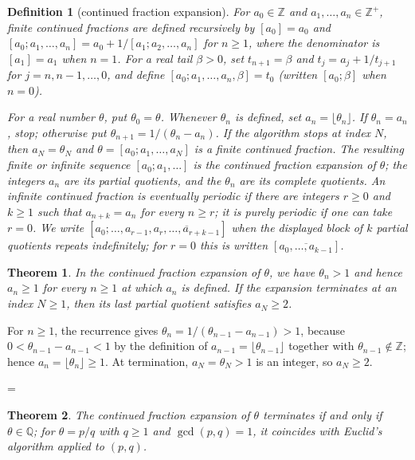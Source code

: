 \documentclass[11pt]{article}
\makeatletter
\theoremstyle{ntstyle}
\newtheorem{theorem}{Theorem}[subsection]
\newtheorem{definition}{Definition}[subsection]
\let\nt@closedisplay\]
\def\nt@guardedclose{\@ifnextchar\par{\nt@closeafterpar}{\@ifnextchar\end{\postdisplaypenalty\@M\nt@closedisplay}{\nt@closedisplay}}}
\def\nt@closeafterpar\par{\@ifnextchar\par{\nt@closeafterpar}{\@ifnextchar\end{\postdisplaypenalty\@M\nt@closedisplay\par}{\nt@closedisplay\par}}}
\renewenvironment{proof}[1][\proofname]{\par
  \pushQED{\qed}\normalfont\topsep\medskipamount\edef\nt@afterproof{\@endparpenalty=\the\@endparpenalty\relax}\@beginparpenalty\@M\@endparpenalty\@M\let\]\nt@guardedclose\trivlist\item[]\textit{#1\@addpunct{.}} \ignorespaces}{\ifvmode\addpenalty\@M\fi\popQED\nt@afterproof\endtrivlist\@endpefalse}
\makeatother
\begin{document}
\begin{definition}[continued fraction expansion]\label{def:10.3.1}
	For $a_0\in\mathbb{Z}$ and $a_1,\ldots,a_n\in\mathbb{Z}^+$, finite
	continued fractions are defined recursively by $[a_0]=a_0$ and
	$[a_0;a_1,\ldots,a_n]=a_0+1/[a_1;a_2,\ldots,a_n]$ for $n\ge1$,
	where the denominator is $[a_1]=a_1$ when $n=1$.
	For a real tail $\beta>0$, set $t_{n+1}=\beta$ and
	$t_j=a_j+1/t_{j+1}$ for $j=n,n-1,\ldots,0$, and define
	$[a_0;a_1,\ldots,a_n,\beta]=t_0$ (written $[a_0;\beta]$ when $n=0$).

	For a real number $\theta$, put $\theta_0=\theta$. Whenever $\theta_n$ is
	defined, set $a_n=\lfloor\theta_n\rfloor$. If $\theta_n=a_n$, stop;
	otherwise put $\theta_{n+1}=1/(\theta_n-a_n)$. If the algorithm stops
	at index $N$, then $a_N=\theta_N$ and
	$\theta=[a_0;a_1,\ldots,a_N]$ is a finite continued fraction.
	The resulting finite or infinite sequence $[a_0;a_1,\ldots]$ is the
	continued fraction expansion
	of $\theta$; the integers $a_n$ are its partial quotients, and the $\theta_n$ are its complete quotients. An infinite continued fraction is
	eventually periodic if there are integers $r\ge0$ and $k\ge1$ such that
	$a_{n+k}=a_n$ for every $n\ge r$; it is purely periodic if one can take
	$r=0$. We write
	$[a_0;\ldots,a_{r-1},\overline{a_r,\ldots,a_{r+k-1}}]$ when the displayed
	block of $k$ partial quotients repeats indefinitely; for $r=0$ this is
	written $[\overline{a_0,\ldots,a_{k-1}}]$.

\end{definition}
\begin{theorem}\label{thm:10.3.1}
	In the continued fraction expansion of $\theta$, we have $\theta_n>1$ and
	hence $a_n\ge1$ for every $n\ge1$ at which $a_n$ is defined. If the
	expansion terminates at an index $N\ge1$, then its last partial quotient
	satisfies $a_N\ge2$.

\end{theorem}

\begin{proof} For $n\ge1$, the recurrence gives
	$\theta_n=1/(\theta_{n-1}-a_{n-1})>1$, because
	$0<\theta_{n-1}-a_{n-1}<1$ by the definition of $a_{n-1}=\lfloor
		\theta_{n-1}\rfloor$ together with $\theta_{n-1}\notin\mathbb{Z}$; hence
	$a_n=\lfloor\theta_n\rfloor\ge1$. At termination, $a_N=\theta_N>1$ is an
	integer, so $a_N\ge2$.

\end{proof}
\begin{theorem}\label{thm:10.3.2} The continued fraction expansion of $\theta$
	terminates if and only if $\theta\in\mathbb{Q}$; for $\theta=p/q$
	with $q\ge1$ and $\gcd(p, q)=1$, it coincides with Euclid's algorithm applied to $(p,q)$.

\end{theorem}
\end{document}
